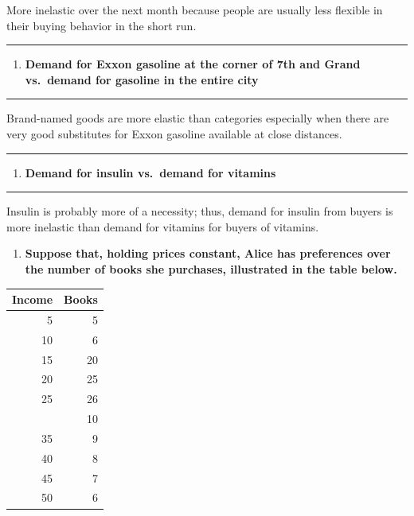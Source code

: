 \documentclass[
  11pt,
]{article}
\providecommand{\tightlist}{%
  \setlength{\itemsep}{0pt}\setlength{\parskip}{0pt}}
\begin{document}
More inelastic over the next month because people are usually less
flexible in their buying behavior in the short run.

\begin{center}\rule{0.5\linewidth}{0.5pt}\end{center}

\begin{enumerate}
\def\labelenumi{\alph{enumi}.}
\setcounter{enumi}{2}
\tightlist
\item
  \textbf{Demand for Exxon gasoline at the corner of 7th and Grand
  vs.~demand for gasoline in the entire city}
\end{enumerate}

\begin{center}\rule{0.5\linewidth}{0.5pt}\end{center}

Brand-named goods are more elastic than categories especially when there
are very good substitutes for Exxon gasoline available at close
distances.

\begin{center}\rule{0.5\linewidth}{0.5pt}\end{center}

\begin{enumerate}
\def\labelenumi{\alph{enumi}.}
\setcounter{enumi}{3}
\tightlist
\item
  \textbf{Demand for insulin vs.~demand for vitamins}
\end{enumerate}

\begin{center}\rule{0.5\linewidth}{0.5pt}\end{center}

Insulin is probably more of a necessity; thus, demand for insulin from
buyers is more inelastic than demand for vitamins for buyers of
vitamins.

\clearpage

\begin{enumerate}
\def\labelenumi{\arabic{enumi}.}
\setcounter{enumi}{3}
\tightlist
\item
  \textbf{Suppose that, holding prices constant, Alice has preferences
  over the number of books she purchases, illustrated in the table
  below.}
\end{enumerate}

\begin{table}
\centering
\begin{tabular}{rr}
\toprule
Income & Books\\
\midrule
5 & 5\\
10 & 6\\
15 & 20\\
20 & 25\\
25 & 26\\
\addlinespace
30 & 10\\
35 & 9\\
40 & 8\\
45 & 7\\
50 & 6\\
\bottomrule
\end{tabular}
\end{table}
\end{document}
